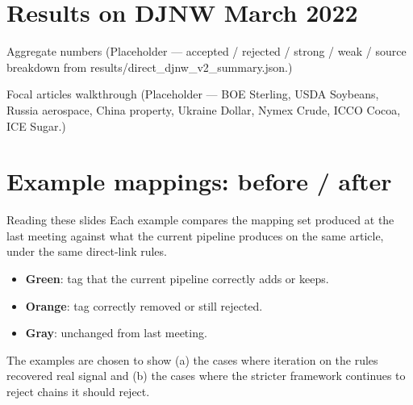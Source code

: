 \documentclass[10pt,aspectratio=169]{beamer}
\begin{document}
\section{Results on DJNW March 2022}

\begin{frame}{Aggregate numbers}
  \small
  (Placeholder --- accepted / rejected / strong / weak / source breakdown
  from results/direct\_djnw\_v2\_summary.json.)
\end{frame}

\begin{frame}{Focal articles walkthrough}
  \small
  (Placeholder --- BOE Sterling, USDA Soybeans, Russia aerospace, China property,
  Ukraine Dollar, Nymex Crude, ICCO Cocoa, ICE Sugar.)
\end{frame}

\section{Example mappings: before / after}

\begin{frame}{Reading these slides}
  \small
  Each example compares the mapping set produced at the last meeting against
  what the current pipeline produces on the same article, under the same
  direct-link rules.

  \medskip
  \begin{itemize}
    \item \textcolor{goodgreen}{\textbf{Green}}: tag that the current pipeline correctly adds or keeps.
    \item \textcolor{YaleAccent}{\textbf{Orange}}: tag correctly removed or still rejected.
    \item \textcolor{YaleGray}{\textbf{Gray}}: unchanged from last meeting.
  \end{itemize}

  \medskip
  The examples are chosen to show (a) the cases where iteration on the rules
  recovered real signal and (b) the cases where the stricter framework
  continues to reject chains it should reject.
\end{frame}
\end{document}
